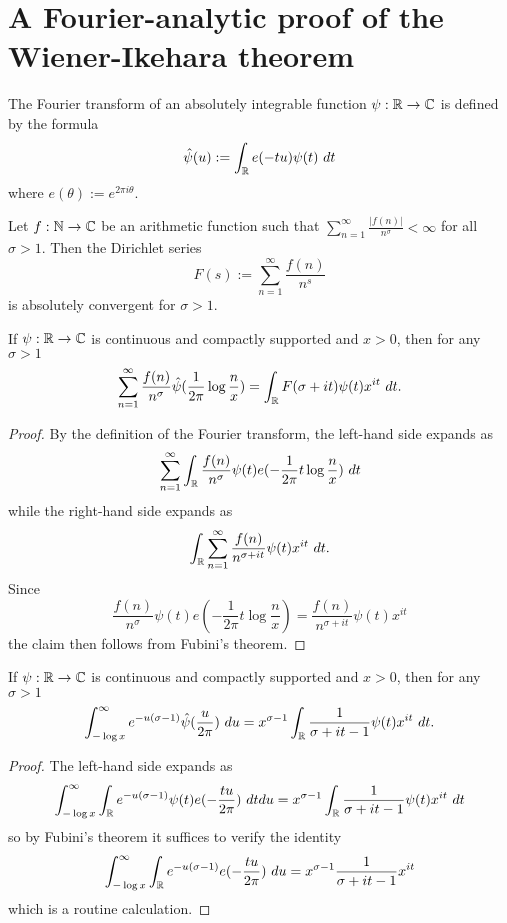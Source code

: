 \chapter{A Fourier-analytic proof of the Wiener-Ikehara theorem}

The Fourier transform of an absolutely integrable function $\psi: \R \to \C$ is defined by the formula
$$ \hat \psi(u) := \int_\R e(-tu) \psi(t)\ dt$$
where $e(\theta) := e^{2\pi i \theta}$.

Let $f: \N \to \C$ be an arithmetic function such that $\sum_{n=1}^\infty \frac{|f(n)|}{n^\sigma} < \infty$ for all $\sigma>1$.  Then the Dirichlet series
$$ F(s) := \sum_{n=1}^\infty \frac{f(n)}{n^s}$$
is absolutely convergent for $\sigma>1$.

\begin{lemma}\label{first-fourier}  If $\psi: \R \to \C$ is continuous and compactly supported and $x > 0$, then for any $\sigma>1$
  $$ \sum_{n=1}^\infty \frac{f(n)}{n^\sigma} \hat \psi( \frac{1}{2\pi} \log \frac{n}{x} ) = \int_\R F(\sigma + it) \psi(t) x^{it}\ dt.$$
\end{lemma}

\begin{proof}  By the definition of the Fourier transform, the left-hand side expands as
$$ \sum_{n=1}^\infty \int_\R \frac{f(n)}{n^\sigma} \psi(t) e( - \frac{1}{2\pi} t \log \frac{n}{x})\ dt$$
while the right-hand side expands as
$$ \int_\R \sum_{n=1}^\infty \frac{f(n)}{n^{\sigma+it}} \psi(t) x^{it}\ dt.$$
Since
$$\frac{f(n)}{n^\sigma} \psi(t) e( - \frac{1}{2\pi} t \log \frac{n}{x}) = \frac{f(n)}{n^{\sigma+it}} \psi(t) x^{it}$$
the claim then follows from Fubini's theorem.
\end{proof}

\begin{lemma}\label{second-fourier} If $\psi: \R \to \C$ is continuous and compactly supported and $x > 0$, then for any $\sigma>1$
$$ \int_{-\log x}^\infty e^{-u(\sigma-1)} \hat \psi(\frac{u}{2\pi})\ du = x^{\sigma - 1} \int_\R \frac{1}{\sigma+it-1} \psi(t) x^{it}\ dt.$$
\end{lemma}

\begin{proof}  The left-hand side expands as
  $$ \int_{-\log x}^\infty \int_\R e^{-u(\sigma-1)} \psi(t) e(-\frac{tu}{2\pi})\ dt du = x^{\sigma - 1} \int_\R \frac{1}{\sigma+it-1} \psi(t) x^{it}\ dt$$
  so by Fubini's theorem it suffices to verify the identity
$$ \int_{-\log x}^\infty \int_\R e^{-u(\sigma-1)} e(-\frac{tu}{2\pi})\ du = x^{\sigma - 1} \frac{1}{\sigma+it-1} x^{it}$$
which is a routine calculation.
\end{proof}

